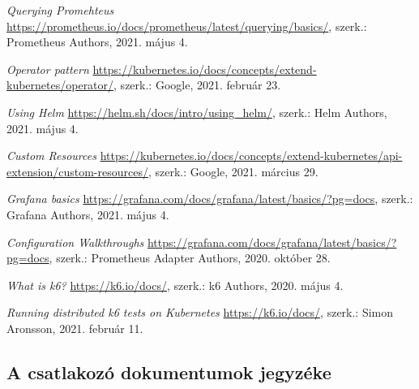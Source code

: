 \documentclass[a4paper,oneside]{article}
\begin{document}
\begin{thebibliography}{9}
 \emph{Querying Promehteus}
  \url{https://prometheus.io/docs/prometheus/latest/querying/basics/}, szerk.: Prometheus Authors,
  2021. május 4.

 \emph{Operator pattern}
  \url{https://kubernetes.io/docs/concepts/extend-kubernetes/operator/}, szerk.: Google,
  2021. február 23.

 \emph{Using Helm}
  \url{https://helm.sh/docs/intro/using_helm/}, szerk.: Helm Authors,
  2021. május 4.

 \emph{Custom Resources}
  \url{https://kubernetes.io/docs/concepts/extend-kubernetes/api-extension/custom-resources/}, szerk.: Google,
  2021. március 29.

 \emph{Grafana basics}
  \url{https://grafana.com/docs/grafana/latest/basics/?pg=docs}, szerk.: Grafana Authors,
  2021. május 4.

 \emph{Configuration Walkthroughs}
  \url{https://grafana.com/docs/grafana/latest/basics/?pg=docs}, szerk.: Prometheus Adapter Authors,
  2020. október 28.

 \emph{What is k6?}
  \url{https://k6.io/docs/}, szerk.: k6 Authors,
  2020. május 4.

 \emph{Running distributed k6 tests on Kubernetes}
  \url{https://k6.io/docs/}, szerk.: Simon Aronsson,
  2021. február 11.

\end{thebibliography}

\subsection{A csatlakozó dokumentumok jegyzéke}
\label{sec:csat-irod}
\end{document}

